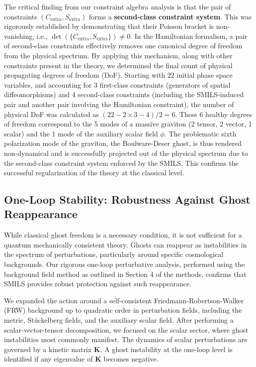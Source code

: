 \documentclass[twocolumn]{aastex631}
\begin{document}
The critical finding from our constraint algebra analysis is that the pair of constraints $(C_{\text{extra}}, S_{\text{extra}})$ forms a \textbf{second-class constraint system}. This was rigorously established by demonstrating that their Poisson bracket is non-vanishing, i.e., $\det(\{C_{\text{extra}}, S_{\text{extra}}\}) \neq 0$. In the Hamiltonian formalism, a pair of second-class constraints effectively removes one canonical degree of freedom from the physical spectrum. By applying this mechanism, along with other constraints present in the theory, we determined the final count of physical propagating degrees of freedom (DoF). Starting with 22 initial phase space variables, and accounting for 3 first-class constraints (generators of spatial diffeomorphisms) and 4 second-class constraints (including the SMILS-induced pair and another pair involving the Hamiltonian constraint), the number of physical DoF was calculated as $(22 - 2 \times 3 - 4) / 2 = 6$. These 6 healthy degrees of freedom correspond to the 5 modes of a massive graviton (2 tensor, 2 vector, 1 scalar) and the 1 mode of the auxiliary scalar field $\phi$. The problematic sixth polarization mode of the graviton, the Boulware-Deser ghost, is thus rendered non-dynamical and is successfully projected out of the physical spectrum due to the second-class constraint system enforced by the SMILS. This confirms the successful regularization of the theory at the classical level.

\subsection{One-Loop Stability: Robustness Against Ghost Reappearance}
While classical ghost freedom is a necessary condition, it is not sufficient for a quantum mechanically consistent theory. Ghosts can reappear as instabilities in the spectrum of perturbations, particularly around specific cosmological backgrounds. Our rigorous one-loop perturbative analysis, performed using the background field method as outlined in Section 4 of the methods, confirms that SMILS provides robust protection against such reappearance.

We expanded the action around a self-consistent Friedmann-Robertson-Walker (FRW) background up to quadratic order in perturbation fields, including the metric, Stückelberg fields, and the auxiliary scalar field. After performing a scalar-vector-tensor decomposition, we focused on the scalar sector, where ghost instabilities most commonly manifest. The dynamics of scalar perturbations are governed by a kinetic matrix $\mathbf{K}$. A ghost instability at the one-loop level is identified if any eigenvalue of $\mathbf{K}$ becomes negative.
\end{document}
